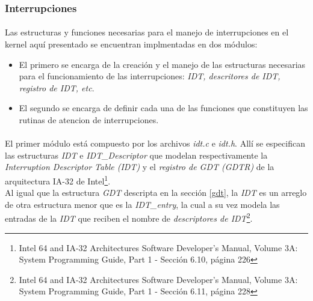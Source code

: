 \documentclass[11pt, a4paper]{article}
\begin{document}
\subsubsection{Interrupciones}
	\paragraph{}
	Las estructuras y funciones necesarias para el manejo de interrupciones en el kernel aquí presentado se encuentran implmentadas en dos módulos: 
	\begin{itemize}
		\item El primero se encarga de la creación y el manejo de las estructuras necesarias para el funcionamiento de las interrupciones: \textit{IDT, descritores de IDT, registro de IDT, etc}.
		\item El segundo se encarga de definir cada una de las funciones que constituyen las rutinas de atencion de interrupciones.
	\end{itemize}
	
	\paragraph{}
	El primer módulo está compuesto por los archivos \textit{idt.c} e \textit{idt.h}. Allí se especifican las estructuras \textit{IDT} e \textit{IDT\_Descriptor} que modelan respectivamente la \textit{Interruption Descriptor Table (IDT)} y el \textit{registro de GDT (GDTR)} de la arquitectura IA-32 de Intel\footnote{Intel 64 and IA-32 Architectures Software Developer’s Manual, Volume 3A: System Programming Guide, Part 1 - Sección 6.10, página 226}.\\
	Al igual que la estructura \textit{GDT} descripta en la sección \ref{gdt}, la \textit{IDT} es un arreglo de otra estructura menor que es la \textit{IDT\_entry}, la cual a su vez modela las entradas de la \textit{IDT} que reciben el nombre  de \textit{descriptores de IDT}\footnote{Intel 64 and IA-32 Architectures Software Developer’s Manual, Volume 3A: System Programming Guide, Part 1 - Sección 6.11, página 228}.
	
\end{document}
